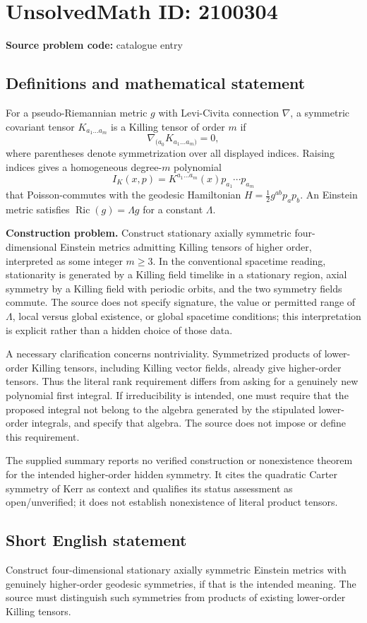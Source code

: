 \documentclass[11pt]{article}
\begin{document}
\section*{UnsolvedMath ID: 2100304}
\textbf{Source problem code:} catalogue entry
\subsection{Definitions and mathematical statement}
For a pseudo-Riemannian metric $g$ with Levi-Civita connection $\nabla$, a symmetric covariant tensor $K_{a_1\ldots a_m}$ is a Killing tensor of order $m$ if
\[
\nabla_{(a_0}K_{a_1\ldots a_m)}=0,
\]
where parentheses denote symmetrization over all displayed indices. Raising indices gives a homogeneous degree-$m$ polynomial
\[
I_K(x,p)=K^{a_1\ldots a_m}(x)p_{a_1}\cdots p_{a_m}
\]
that Poisson-commutes with the geodesic Hamiltonian $H=\tfrac12g^{ab}p_ap_b$. An Einstein metric satisfies $\operatorname{Ric}(g)=\Lambda g$ for a constant $\Lambda$.

\textbf{Construction problem.} Construct stationary axially symmetric four-dimensional Einstein metrics admitting Killing tensors of higher order, interpreted as some integer $m\geq3$. In the conventional spacetime reading, stationarity is generated by a Killing field timelike in a stationary region, axial symmetry by a Killing field with periodic orbits, and the two symmetry fields commute. The source does not specify signature, the value or permitted range of $\Lambda$, local versus global existence, or global spacetime conditions; this interpretation is explicit rather than a hidden choice of those data.

A necessary clarification concerns nontriviality. Symmetrized products of lower-order Killing tensors, including Killing vector fields, already give higher-order tensors. Thus the literal rank requirement differs from asking for a genuinely new polynomial first integral. If irreducibility is intended, one must require that the proposed integral not belong to the algebra generated by the stipulated lower-order integrals, and specify that algebra. The source does not impose or define this requirement.

The supplied summary reports no verified construction or nonexistence theorem for the intended higher-order hidden symmetry. It cites the quadratic Carter symmetry of Kerr as context and qualifies its status assessment as open/unverified; it does not establish nonexistence of literal product tensors.
\subsection{Short English statement}
Construct four-dimensional stationary axially symmetric Einstein metrics with genuinely higher-order geodesic symmetries, if that is the intended meaning. The source must distinguish such symmetries from products of existing lower-order Killing tensors.
\end{document}
